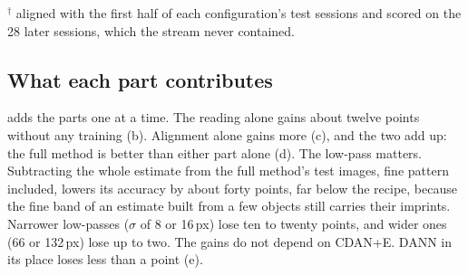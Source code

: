 \begin{table}[t]
  \centering\footnotesize\setlength{\tabcolsep}{3pt}
  \caption{\textbf{What each part contributes} (ResNet-50, 55 cross-hardware sessions). $\Delta$: paired difference to the row named, with its 95\pct\ interval, over the seeds both runs have (three, or five where marked $^5$).}
  \label{tab:ablation}
  \par\smallskip\raggedright\scriptsize $^\dagger$ aligned with the first half of each configuration's test sessions and scored on the 28 later sessions, which the stream never contained.
\end{table}

\subsection{What each part contributes}
\label{sec:ablation}

 adds the parts one at a time. The reading alone gains about twelve points without any training (b). Alignment alone gains more (c), and the two add up: the full method is better than either part alone (d). The low-pass matters. Subtracting the whole estimate from the full method's test images, fine pattern included, lowers its accuracy by about forty points, far below the recipe, because the fine band of an estimate built from a few objects still carries their imprints. Narrower low-passes ($\sigma$ of 8 or 16\,px) lose ten to twenty points, and wider ones (66 or 132\,px) lose up to two. The gains do not depend on CDAN+E. DANN in its place loses less than a point (e).

